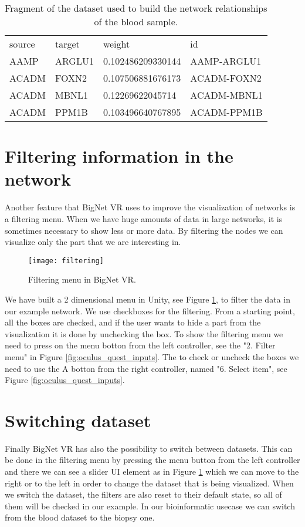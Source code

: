 \begin{table}[h!]
\centering
\begin{tabular}{llll}
\hline
source & target & weight            & id          \\
AAMP   & ARGLU1 & 0.102486209330144 & AAMP-ARGLU1 \\
ACADM  & FOXN2  & 0.107506881676173 & ACADM-FOXN2 \\
ACADM  & MBNL1  & 0.12269622045714  & ACADM-MBNL1 \\
ACADM  & PPM1B  & 0.103496640767895 & ACADM-PPM1B \\
\hline
\end{tabular}
\caption{Fragment of the dataset used to build the network relationships of the blood sample.}
\label{tab:network-data}
\end{table}

\section{Filtering information in the network}
Another feature that BigNet VR uses to improve the visualization of networks is a filtering menu. When we have huge amounts of data in large networks, it is sometimes necessary to show less or more data. By filtering the nodes we can visualize only the part that we are interesting in.


\begin{figure}[h!]
    \centering%
    \texttt{[image: filtering]}
    \caption{Filtering menu in BigNet VR.}
    \label{fig:filtering}
\end{figure}%


We have built a 2 dimensional menu in Unity, see Figure \ref{fig:filtering}, to filter the data in our example network. We use checkboxes for the filtering. From a starting point, all the boxes are checked, and if the user wants to hide a part from the visualization it is done by unchecking the box. To show the filtering menu we need to press on the menu botton from the left controller, see the "2. Filter menu" in Figure \ref{fig:oculus_quest_inputs}. The to check or uncheck the boxes we need to use the A botton from the right controller, named "6. Select item", see Figure \ref{fig:oculus_quest_inputs}.

\section{Switching dataset}
Finally BigNet VR has also the possibility to switch between datasets. This can be done in the filtering menu by pressing the menu button from the left controller and there we can see a slider UI element as in Figure \ref{fig:filtering} which we can move to the right or to the left in order to change the dataset that is being visualized. When we switch the dataset, the filters are also reset to their default state, so all of them will be checked in our example. In our bioinformatic usecase we can switch from the blood dataset to the biopsy one.
